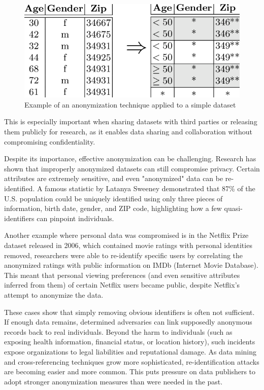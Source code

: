 \documentclass{article}
\begin{document}
\begin{figure}[h]
    \centering
    \includegraphics[width=0.65\linewidth]{images/figure1.png}
    \caption{Example of an anonymization technique applied to a simple dataset}
    \label{fig:anonymization-example}
\end{figure}

This is especially important when sharing datasets with third parties or releasing them publicly for research, as it enables data sharing and collaboration without compromising confidentiality.

Despite its importance, effective anonymization can be challenging. Research has shown that improperly anonymized datasets can still compromise privacy. Certain attributes are extremely sensitive, and even "anonymized" data can be re-identified. A famous statistic by Latanya Sweeney demonstrated that 87\% of the U.S. population could be uniquely identified using only three pieces of information, birth date, gender, and ZIP code, highlighting how a few quasi-identifiers can pinpoint individuals.

Another example where personal data was compromised is in the Netflix Prize dataset released in 2006, which contained movie ratings with personal identities removed, researchers were able to re-identify specific users by correlating the anonymized ratings with public information on IMDb (Internet Movie Database). This meant that personal viewing preferences (and even sensitive attributes inferred from them) of certain Netflix users became public, despite Netflix’s attempt to anonymize the data.

These cases show that simply removing obvious identifiers is often not sufficient. If enough data remains, determined adversaries can link supposedly anonymous records back to real individuals. Beyond the harm to individuals (such as exposing health information, financial status, or location history), such incidents expose organizations to legal liabilities and reputational damage. As data mining and cross-referencing techniques grow more sophisticated, re-identification attacks are becoming easier and more common. This puts pressure on data publishers to adopt stronger anonymization measures than were needed in the past.
\end{document}
